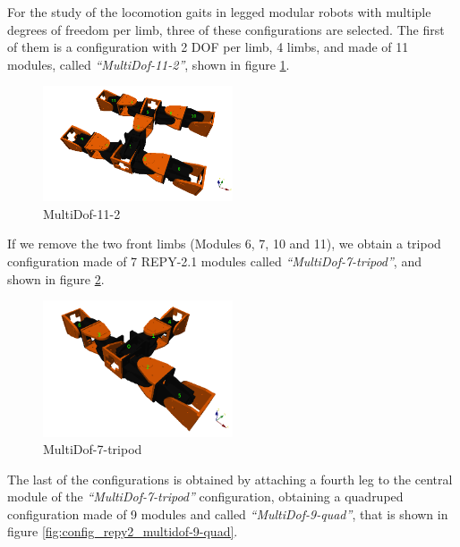 For the study of the locomotion gaits in legged modular robots with multiple degrees of freedom per limb, three of these configurations are selected. The first of them is a configuration with 2 DOF per limb, 4 limbs, and made of 11 modules, called \emph{``MultiDof-11-2''}, shown in figure \ref{fig:config_repy2_multidof-11-2}.\\

\begin{figure}[b]
		\centering
        \includegraphics[width=0.5\textwidth]{images/Conf_repy2_multidof-11-2.png}
        \caption{MultiDof-11-2}
        \label{fig:config_repy2_multidof-11-2}
\end{figure}

If we remove the two front limbs (Modules 6, 7, 10 and 11), we obtain a tripod configuration made of 7 REPY-2.1 modules called \emph{``MultiDof-7-tripod''}, and shown in figure \ref{fig:config_repy2_multidof-7-tripod}.\\

\begin{figure}[t]
		\centering
        \includegraphics[width=0.5\textwidth]{images/Conf_repy2_multidof-7-tripod.png}
        \caption{MultiDof-7-tripod}
        \label{fig:config_repy2_multidof-7-tripod}
\end{figure}

The last of the configurations is obtained by attaching a fourth leg to the central module of the \emph{``MultiDof-7-tripod''} configuration, obtaining a quadruped configuration made of 9 modules and called \emph{``MultiDof-9-quad''}, that is shown in figure \ref{fig:config_repy2_multidof-9-quad}.\\

